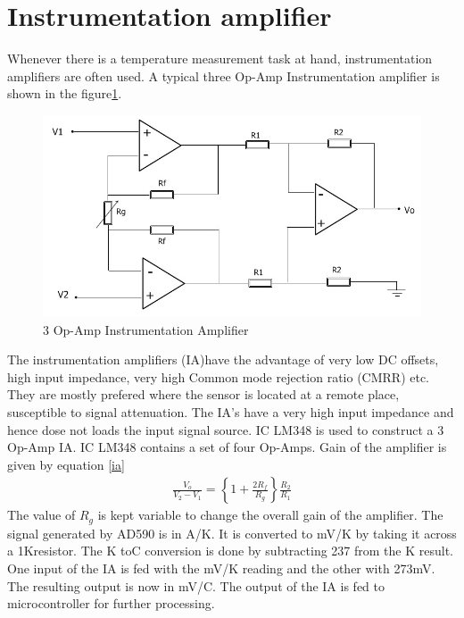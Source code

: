\documentclass[12pt]{report}
\begin{document}
\section{Instrumentation amplifier}
Whenever there is a temperature measurement task at hand, instrumentation amplifiers are often used. A typical three Op-Amp Instrumentation amplifier is shown in the figure\ref{instramp}.
\begin{figure}
\centering
\includegraphics[width=0.6\linewidth]{Inst_Amp}
\caption{3 Op-Amp Instrumentation Amplifier}
\label{instramp}
\end{figure}
The instrumentation amplifiers (IA)have the advantage of very low DC offsets, high input impedance, very high Common mode rejection ratio (CMRR) etc. They are mostly prefered where the sensor is located at a remote place, susceptible to signal attenuation. The IA's have a very high input impedance and hence dose not loads the input signal source. IC LM348 is used to construct a 3 Op-Amp IA. IC LM348 contains a set of four Op-Amps. Gain of the amplifier is given by equation \ref{ia}
\begin{align}
\frac{V_o}{V_2-V_1}=\left\{1+\frac{2R_f}{R_g}\right\}\frac{R_2}{R_1}
\label{ia}
\end{align} 
The value of $R_g$ is kept variable to change the overall gain of the amplifier.
The signal generated by AD590 is in \textmu A/\textdegree K.  It is converted to mV/\textdegree K by taking it across a 1K\textohm  resistor. The  \textdegree K to\textdegree C conversion is done by subtracting 237 from the \textdegree K result. One input of the IA is fed with the mV/\textdegree K reading and the other with 273mV. The resulting output is now in mV/\textdegree C. The output of the IA is fed to microcontroller for further processing.
\end{document}
